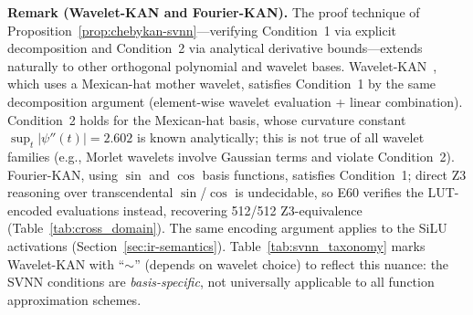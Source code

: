 \vspace{4pt}
\noindent\textbf{Remark (Wavelet-KAN and Fourier-KAN).}
The proof technique of Proposition~\ref{prop:chebykan-svnn}---verifying
Condition~1 via explicit decomposition and Condition~2 via analytical
derivative bounds---extends naturally to other orthogonal polynomial and
wavelet bases. Wavelet-KAN~\cite{bozorgasl2024chebykan}, which uses
a Mexican-hat mother wavelet, satisfies Condition~1 by the
same decomposition argument (element-wise wavelet evaluation + linear
combination). Condition~2 holds for the Mexican-hat basis, whose
curvature constant $\sup_t |\psi''(t)| = 2.602$ is known analytically;
this is not true of all wavelet families (e.g.,
Morlet wavelets involve Gaussian terms and violate Condition~2).
Fourier-KAN, using $\sin$ and $\cos$ basis functions, satisfies Condition~1;
direct Z3 reasoning over transcendental $\sin$/$\cos$ is undecidable, so
E60 verifies the LUT-encoded evaluations instead, recovering 512/512
Z3-equivalence (Table~\ref{tab:cross_domain}). The same encoding argument
applies to the SiLU activations (Section~\ref{sec:ir-semantics}).
Table~\ref{tab:svnn_taxonomy} marks Wavelet-KAN with
``$\sim$'' (depends on wavelet choice) to reflect this nuance: the SVNN
conditions are \textit{basis-specific}, not universally applicable to all
function approximation schemes.

